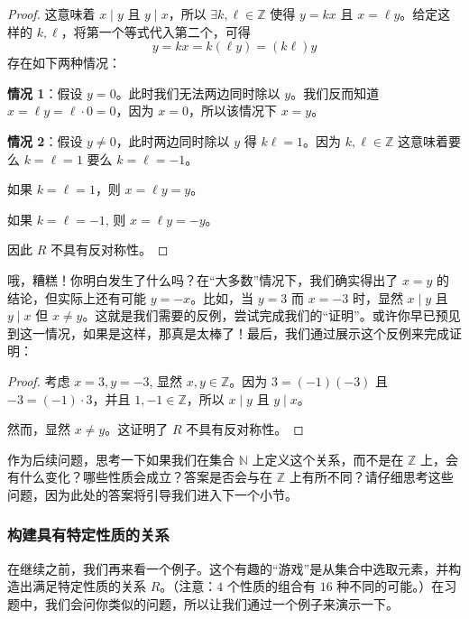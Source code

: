 \begin{example}
\begin{itemize}
\begin{proof}
            这意味着 $x \mid y$ 且 $y \mid x$，所以 $\exists k, \ell \in \mathbb{Z}$ 使得 $y = kx$ 且 $x = \ell y$。给定这样的 $k, \ell$，将第一个等式代入第二个，可得
            \[y = kx = k(\ell y) = (k \ell)y\]
            存在如下两种情况：

            \textbf{情况 1}：假设 $y=0$。此时我们无法两边同时除以 $y$。我们反而知道 $x = \ell y = \ell \cdot 0 = 0$，因为 $x=0$，所以该情况下 $x=y$。

            \textbf{情况 2}：假设 $y \ne 0$，此时两边同时除以 $y$ 得 $k \ell = 1$。因为 $k, \ell \in \mathbb{Z}$ 这意味着要么 $k = \ell = 1$ 要么 $k = \ell = -1$。

            如果 $k = \ell = 1$，则 $x = \ell y = y$。

            如果 $k = \ell = -1$, 则 $x = \ell y = -y$。

            因此 $R$ 不具有反对称性。
        \end{proof}
        哦，糟糕！你明白发生了什么吗？在``大多数''情况下，我们确实得出了 $x = y$ 的结论，但实际上还有可能 $y = -x$。比如，当 $y = 3$ 而 $x = -3$ 时，显然 $x \mid y$ 且 $y \mid x$ 但 $x \ne y$。这就是我们需要的反例，尝试完成我们的``证明''。或许你早已预见到这一情况，如果是这样，那真是太棒了！最后，我们通过展示这个反例来完成证明：
        \begin{proof}
            考虑 $x=3, y=-3$, 显然 $x, y \in \mathbb{Z}$。因为 $3 = (-1)(-3)$ 且 $-3 = (-1) \cdot 3$，并且 $1, -1 \in \mathbb{Z}$，所以 $x \mid y$ 且 $y \mid x$。

            然而，显然 $x \ne y$。这证明了 $R$ 不具有反对称性。
        \end{proof}
    \end{itemize}
\end{example}

作为后续问题，思考一下如果我们在集合 $\mathbb{N}$ 上定义这个关系，而不是在 $\mathbb{Z}$ 上，会有什么变化？哪些性质会成立？答案是否会与在 $\mathbb{Z}$ 上有所不同？请仔细思考这些问题，因为此处的答案将引导我们进入下一个小节。

\subsubsection*{构建具有特定性质的关系}

在继续之前，我们再来看一个例子。这个有趣的``游戏''是从集合中选取元素，并构造出满足特定性质的关系 $R$。（注意：$4$ 个性质的组合有 $16$ 种不同的可能。）在习题中，我们会问你类似的问题，所以让我们通过一个例子来演示一下。

